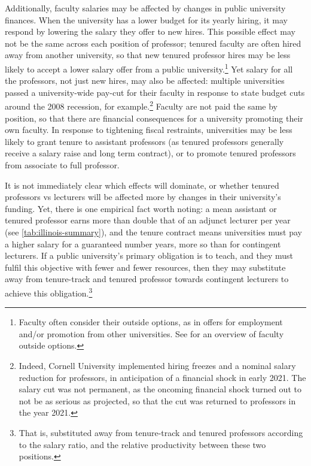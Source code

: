 Additionally, faculty salaries may be affected by changes in public university finances.
When the university has a lower budget for its yearly hiring, it may respond by lowering the salary they offer to new hires.
This possible effect may not be the same across each position of professor; tenured faculty are often hired away from another university, so that new tenured professor hires may be less likely to accept a lower salary offer from a public university.\footnote{
    Faculty often consider their outside options, as in offers for employment and/or promotion from other universities.
    See \cite{blackaby2005} for an overview of faculty outside options.
}
Yet salary for all the professors, not just new hires, may also be affected: multiple universities passed a university-wide pay-cut for their faculty in response to state budget cuts around the 2008 recession, for example.\footnote{
    Indeed, Cornell University implemented hiring freezes and a nominal salary reduction for professors, in anticipation of a financial shock in early 2021.
    The salary cut was not permanent, as the oncoming financial shock turned out to not be as serious as projected, so that the cut was returned to professors in the year 2021.
}
Faculty are not paid the same by position, so that there are financial consequences for a university promoting their own faculty.
In response to tightening fiscal restraints, universities may be less likely to grant tenure to assistant professors (as tenured professors generally receive a salary raise and long term contract), or to promote tenured professors from associate to full professor.


It is not immediately clear which effects will dominate, or whether tenured professors vs lecturers will be affected more by changes in their university's funding.
Yet, there is one empirical fact worth noting: a mean assistant or tenured professor earns more than double that of an adjunct lecturer per year (see \autoref{tab:illinois-summary}), and the tenure contract means universities must pay a higher salary for a guaranteed number years, more so than for contingent lecturers.
If a public university's primary obligation is to teach, and they must fulfil this objective with fewer and fewer resources, then they may substitute away from tenure-track and tenured professor towards contingent lecturers to achieve this obligation.\footnote{
    That is, substituted away from tenure-track and tenured professors according to the salary ratio, and the relative productivity between these two positions.
}
